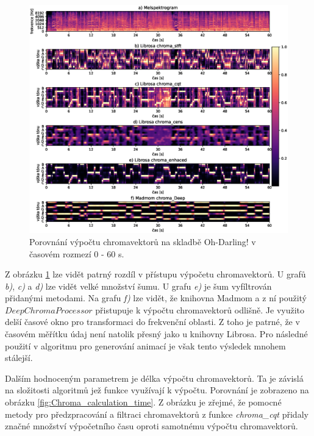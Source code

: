 \begin{figure}[H]
    \centering
    \includegraphics[width = 1\linewidth]{obrazky/Oh-Darling_chroma_analysis_graphs.eps}
    \caption{Porovnání výpočtu chromavektorů na skladbě Oh-Darling! v časovém rozmezí 0 - 60 s.}
    \label{fig:Chroma_analysis}
\end{figure}

Z obrázku \ref{fig:Chroma_analysis} lze vidět patrný rozdíl v přístupu výpočetu chromavektorů. U grafů \textit{b)}, \textit{c)} a \textit{d)} lze vidět velké množství šumu. U grafu \textit{e)} je šum vyfíltrován přidanými metodami. Na grafu \textit{f)} lze vidět, že knihovna Madmom a z ní použitý $DeepChromaProcessor$ přistupuje k výpočtu chromavektorů odlišně. Je využito delší časové okno pro transformaci do frekvenční oblasti. Z toho je patrné, že v časovém měřítku údaj není natolik přesný jako u knihovny Librosa. Pro následné použití v algoritmu pro generování animací je však tento výsledek mnohem stálejší. 

Dalším hodnoceným parametrem je délka výpočtu chromavektorů. Ta je závislá na složitosti algoritmů jež funkce využívají k výpočtu. Porovnání je zobrazeno na obrázku \ref{fig:Chroma_calculation_time}. Z obrázku je zřejmé, že pomocné metody pro předzpracování a filtraci chromavektorů z funkce \textit{chroma\_cqt} přidaly značné množství výpočetního času oproti samotnému výpočtu chromavektorů.

